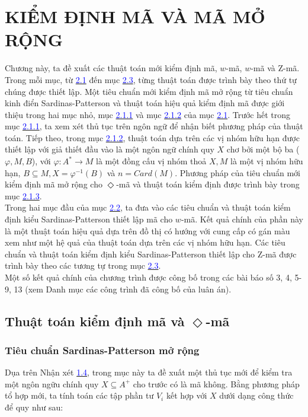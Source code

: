 \setcounter{chapter}{1}
\chapter{KIỂM ĐỊNH MÃ VÀ MÃ MỞ RỘNG}

\begin{flushleft}
Chương này, ta đề xuất các thuật toán mới kiểm định mã, $w$-mã, $w$-mã và Z-mã. Trong mỗi mục, từ \hyperlink{42}{\textcolor{blue}{2.1}} đến mục \hyperlink{page.52}{\textcolor{blue}{2.3}}, từng thuật toán được trình bày theo thứ tự chúng được thiết lập. Một tiêu chuẩn mới kiểm định mã mở rộng từ tiêu chuẩn kinh điển Sardinas-Patterson và thuật toán hiệu quả kiểm định mã được giới thiệu trong hai mục nhỏ, mục \hyperlink{page.42}{\textcolor{blue}{2.1.1}} và mục \hyperlink{page.32}{\textcolor{blue}{2.1.2}} của mục \hyperlink{page.42}{\textcolor{blue}{2.1}}. Trước hết trong mục \hyperlink{page.42}{\textcolor{blue}{2.1.1}}, ta xem xét thủ tục trên ngôn ngữ để nhận biết phương pháp của thuật toán. Tiếp theo, trong mục \hyperlink{page.42}{\textcolor{blue}{2.1.2}}, thuật toán dựa trên các vị nhóm hữu hạn được thiết lập với giả thiết đầu vào là một ngôn ngữ chính quy $X$ chơ bởi một bộ ba ($\varphi, M, B$), với $\varphi : A^* \to M$ là một đồng cấu vị nhóm thoả $X, M$ là một vị nhóm hữu hạn, $B \subseteq M, X = \varphi^{-1} (B)$ và $n = Card(M)$. Phương pháp của tiêu chuẩn mới kiểm định mã mở rộng cho $\Diamond$-mã và thuật toán kiểm định được trình bày trong mục \hyperlink{page.44}{\textcolor{blue}{2.1.3}}. \\
\hspace{10mm}Trong hai mục đầu của mục \hyperlink{page.46}{\textcolor{blue}{2.2}}, ta đưa vào các tiêu chuẩn và thuật toán kiểm định kiểu Sardinas-Patterson thiết lập mã cho $w$-mã. Kết quả chính của phần này là một thuật toán hiệu quả dựa trên đồ thị có hướng với cung cấp có gán màu xem như một hệ quả của thuật toán dựa trên các vị nhóm hữu hạn. Các tiêu chuẩn và thuật toán kiểm định kiểu Sardinas-Patterson thiết lập cho Z-mã được trình bày theo các tương tự trong mục \hyperlink{page.52}{\textcolor{blue}{2.3}}.\\
\hspace{10mm}Một số kết quả chính của chương trình được công bố trong các bài báo số 3, 4, 5-9, 13 (xem Danh mục các công trình đã công bố của luân án).\\
\section{Thuật toán kiểm định mã và $\Diamond$-mã}
\subsection{Tiêu chuẩn Sardinas-Patterson mở rộng}
Dụa trên Nhận xét \hyperlink{page.18}{\textcolor{blue}{1.4}}, trong mục này ta đề xuất một thủ tục mới để kiểm tra một ngôn ngữu chính quy $X \subseteq A^+$ cho trước có là mã không. Bằng phương pháp tổ hợp mới, ta tính toán các tập phần tư $V_i$ kết hợp với $X$ dưới dạng công thức để quy như sau:
\end{flushleft}
